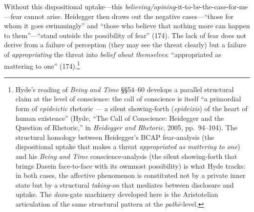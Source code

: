 \documentclass{article}
\begin{document}
Without this dispositional uptake---this \textit{believing/opining}-it-to-be-the-case-for-me---fear cannot arise. Heidegger then draws out the negative cases---``those for whom it goes swimmingly'' and ``those who believe that nothing more can happen to them''---``stand outside the possibility of fear'' (174). The lack of fear does not derive from a failure of perception (they may see the threat clearly) but a failure of \textit{appropriating} the threat into \textit{belief about themselves}: ``appropriated as mattering to one'' (174).\footnote{Hyde's reading of \textit{Being and Time} \S\S 54--60 develops a parallel structural claim at the level of conscience: the call of conscience is itself ``a primordial form of \textit{epideictic} rhetoric --- a silent showing-forth (\textit{epideixis}) of the heart of human existence'' (Hyde, ``The Call of Conscience: Heidegger and the Question of Rhetoric,'' in \textit{Heidegger and Rhetoric}, 2005, pp.~94--104). The structural homology between Heidegger's BCAP fear-analysis (the dispositional uptake that makes a threat \textit{appropriated as mattering to one}) and his \textit{Being and Time} conscience-analysis (the silent showing-forth that brings Dasein face-to-face with its ownmost possibility) is what Hyde tracks: in both cases, the affective phenomenon is constituted not by a private inner state but by a structural \textit{taking-on} that mediates between disclosure and uptake. The \textit{doxa}-gate machinery developed here is the Aristotelian articulation of the same structural pattern at the \textit{pathē}-level.}
\end{document}
